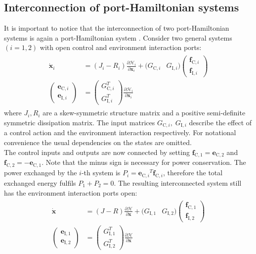 \documentclass[a4paper,twoside, openright,12pt]{report}
\newcommand{\f}[1]{\boldsymbol{#1}}
\newcommand{\g}[1]{\text{#1}}
\begin{document}
\subsection{Interconnection of port-Hamiltonian systems}
It is important to notice that the interconnection of two port-Hamiltonian systems is again a port-Hamiltonian system \cite{Schaft_14}. Consider two general systems $(i=1,2)$ with open control and environment interaction ports:
\begin{eqnarray}
\begin{aligned}
	\dot{\f{x}}_i &= (J_i - R_i)\frac{\partial \mathcal{H}_i}{\partial \f{x}_i} + (G_{\g{C},i} & G_{\g{I},i})\begin{pmatrix}\f{f}_{\g{C},i} \\ \f{f}_{\g{I},i}\end{pmatrix}\\
	\begin{pmatrix}\f{e}_{\g{C},i} \\ \f{e}_{\g{I},i}\end{pmatrix} &= \begin{pmatrix}G_{\g{C},i}^T \\ G_{\g{I},i}^T\end{pmatrix}\frac{\partial \mathcal{H}_i}{\partial \f{x}_i}
\end{aligned}
\end{eqnarray}
where $J_i,R_i$ are a skew-symmetric structure matrix and a positive semi-definite symmetric dissipation matrix. The input matrices $G_{\g{C},i},\; G_{\g{I},i}$ describe the effect of a control action and the environment interaction respectively.
For notational convenience the usual dependencies on the states are omitted.\\
The control inputs and outputs are now connected by setting $\f{f}_{\g{C},1} = \f{e}_{\g{C},2} $ and $ \f{f}_{\g{C},2} = -\f{e}_{\g{C},1} $. Note that the minus sign is necessary for power conservation. The power exchanged by the $i$-th system is $P_i = {\f{e}_{\g{C},i}}^T \f{f}_{\g{C},i}$, therefore the total exchanged energy fulfils $ P_1 + P_2 = 0 $. The resulting interconnected system still has the environment interaction ports open:
\begin{eqnarray}
\begin{aligned}
	\dot{\f{x}} &= (J - R)\frac{\partial \mathcal{H}}{\partial \f{x}}+ (G_{\g{I},1} & G_{\g{I},2})\begin{pmatrix}\f{f}_{\g{C},1} \\ \f{f}_{\g{I},2}\end{pmatrix}\\
	\begin{pmatrix}\f{e}_{\g{I},1} \\ \f{e}_{\g{I},2}\end{pmatrix} &= \begin{pmatrix}G_{\g{I},1}^T \\ G_{\g{I},2}^T\end{pmatrix}\frac{\partial \mathcal{H}}{\partial \f{x}}
\end{aligned}
\end{eqnarray}
\end{document}
